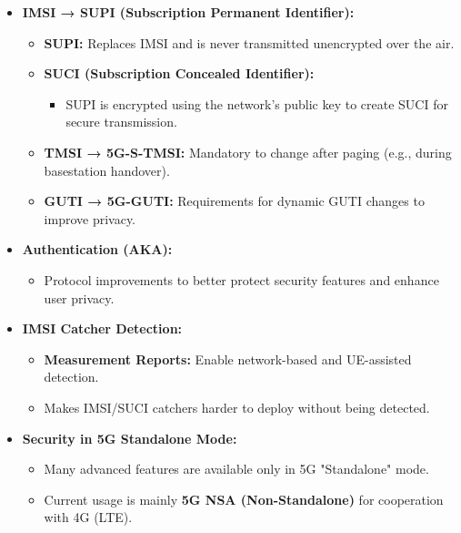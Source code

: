 \begin{itemize}
    \item \textbf{IMSI → SUPI (Subscription Permanent Identifier):}
    \begin{itemize}
        \item \textbf{SUPI:} Replaces IMSI and is never transmitted unencrypted over the air.
        \item \textbf{SUCI (Subscription Concealed Identifier):}
        \begin{itemize}
            \item SUPI is encrypted using the network's public key to create SUCI for secure transmission.
        \end{itemize}
        \item \textbf{TMSI → 5G-S-TMSI:} Mandatory to change after paging (e.g., during basestation handover).
        \item \textbf{GUTI → 5G-GUTI:} Requirements for dynamic GUTI changes to improve privacy.
    \end{itemize}

    \item \textbf{Authentication (AKA):}
    \begin{itemize}
        \item Protocol improvements to better protect security features and enhance user privacy.
    \end{itemize}

    \item \textbf{IMSI Catcher Detection:}
    \begin{itemize}
        \item \textbf{Measurement Reports:} Enable network-based and UE-assisted detection.
        \item Makes IMSI/SUCI catchers harder to deploy without being detected.
    \end{itemize}

    \item \textbf{Security in 5G Standalone Mode:}
    \begin{itemize}
        \item Many advanced features are available only in 5G "Standalone" mode.
        \item Current usage is mainly \textbf{5G NSA (Non-Standalone)} for cooperation with 4G (LTE).
    \end{itemize}
\end{itemize}

